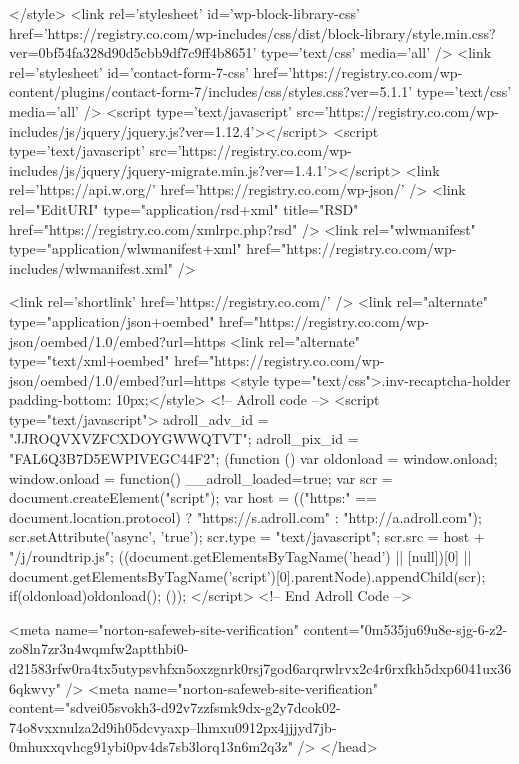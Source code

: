 </style>
<link rel='stylesheet' id='wp-block-library-css'  href='https://registry.co.com/wp-includes/css/dist/block-library/style.min.css?ver=0bf54fa328d90d5cbb9df7c9ff4b8651' type='text/css' media='all' />
<link rel='stylesheet' id='contact-form-7-css'  href='https://registry.co.com/wp-content/plugins/contact-form-7/includes/css/styles.css?ver=5.1.1' type='text/css' media='all' />
<script type='text/javascript' src='https://registry.co.com/wp-includes/js/jquery/jquery.js?ver=1.12.4'></script>
<script type='text/javascript' src='https://registry.co.com/wp-includes/js/jquery/jquery-migrate.min.js?ver=1.4.1'></script>
<link rel='https://api.w.org/' href='https://registry.co.com/wp-json/' />
<link rel="EditURI" type="application/rsd+xml" title="RSD" href="https://registry.co.com/xmlrpc.php?rsd" />
<link rel="wlwmanifest" type="application/wlwmanifest+xml" href="https://registry.co.com/wp-includes/wlwmanifest.xml" /> 

<link rel='shortlink' href='https://registry.co.com/' />
<link rel="alternate" type="application/json+oembed" href="https://registry.co.com/wp-json/oembed/1.0/embed?url=https%
<link rel="alternate" type="text/xml+oembed" href="https://registry.co.com/wp-json/oembed/1.0/embed?url=https%
<style type="text/css">.inv-recaptcha-holder { padding-bottom: 10px;}</style>  
<!-- Adroll code -->
<script type="text/javascript">
adroll_adv_id = "JJROQVXVZFCXDOYGWWQTVT";
adroll_pix_id = "FAL6Q3B7D5EWPIVEGC44F2";
(function () {
var oldonload = window.onload;
window.onload = function(){
   __adroll_loaded=true;
   var scr = document.createElement("script");
   var host = (("https:" == document.location.protocol) ? "https://s.adroll.com" : "http://a.adroll.com");
   scr.setAttribute('async', 'true');
   scr.type = "text/javascript";
   scr.src = host + "/j/roundtrip.js";
   ((document.getElementsByTagName('head') || [null])[0] ||
    document.getElementsByTagName('script')[0].parentNode).appendChild(scr);
   if(oldonload){oldonload()}};
}());
</script>
<!-- End Adroll Code -->

<meta name="norton-safeweb-site-verification" content="0m535ju69u8e-sjg-6-z2-zo8ln7zr3n4wqmfw2aptthbi0-d21583rfw0ra4tx5utypsvhfxn5oxzgnrk0rsj7god6arqrwlrvx2c4r6rxfkh5dxp6041ux366qkwvy" />
<meta name="norton-safeweb-site-verification" content="sdvei05svokh3-d92v7zzfsmk9dx-g2y7dcok02-74o8vxxnulza2d9ih05dcvyaxp--lhmxu0912px4jjjyd7jb-0mhuxxqvhcg91ybi0pv4ds7sb3lorq13n6m2q3z" />
</head>

